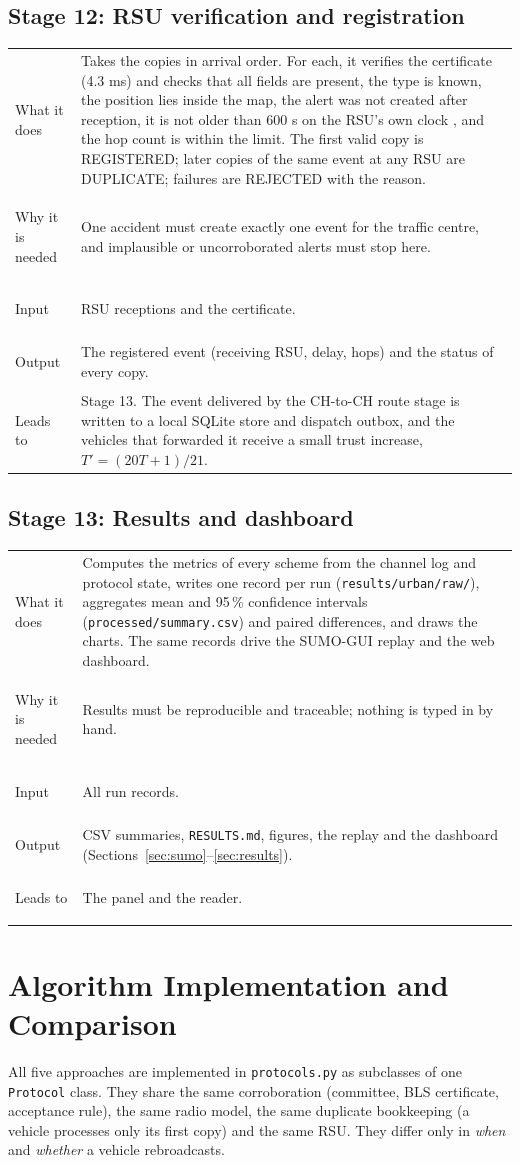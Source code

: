 \documentclass[11pt, a4paper]{article}
\makeatletter
\newcommand{\stage}[5]{%
  \par\noindent\begin{tabular}{@{}>{\bfseries\raggedright\arraybackslash}p{0.17\textwidth}p{0.79\textwidth}@{}}
  What it does & #1\\
  Why it is needed & #2\\
  Input & #3\\
  Output & #4\\
  Leads to & #5\\
  \end{tabular}\par\vspace{4pt}}
\makeatother
\begin{document}
\subsection{Stage 12: RSU verification and registration}
\stage{Takes the copies in arrival order. For each, it verifies the certificate (4.3 ms) and checks that all fields are
present, the type is known, the position lies inside the map, the alert was not created after reception, it is not older
than 600 s on the RSU's own clock \cite{etsi302637_3}, and the hop count is within the limit. The first valid copy is
REGISTERED; later copies of the same event at any RSU are DUPLICATE; failures are REJECTED with the reason.}
{One accident must create exactly one event for the traffic centre, and implausible or uncorroborated alerts must stop
here.}
{RSU receptions and the certificate.}
{The registered event (receiving RSU, delay, hops) and the status of every copy.}
{Stage 13. The event delivered by the CH-to-CH route stage is written to a local SQLite store and dispatch outbox, and the
vehicles that forwarded it receive a small trust increase, $T' = (20T + 1)/21$.}

\subsection{Stage 13: Results and dashboard}
\stage{Computes the metrics of every scheme from the channel log and protocol state, writes one record per run
(\texttt{results/urban/raw/}), aggregates mean and 95\,\% confidence intervals (\texttt{processed/summary.csv}) and paired
differences, and draws the charts. The same records drive the SUMO-GUI replay and the web dashboard.}
{Results must be reproducible and traceable; nothing is typed in by hand.}
{All run records.}
{CSV summaries, \texttt{RESULTS.md}, figures, the replay and the dashboard (Sections~\ref{sec:sumo}--\ref{sec:results}).}
{The panel and the reader.}

\section{Algorithm Implementation and Comparison}
\label{sec:algos}
All five approaches are implemented in \texttt{protocols.py} as subclasses of one \texttt{Protocol} class. They share the
same corroboration (committee, BLS certificate, acceptance rule), the same radio model, the same duplicate bookkeeping
(a vehicle processes only its first copy) and the same RSU. They differ only in \emph{when} and \emph{whether} a vehicle
rebroadcasts.
\end{document}
